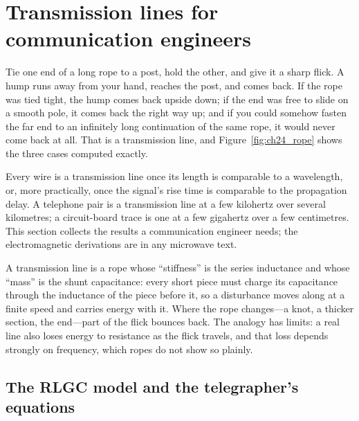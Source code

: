 \section{Transmission lines for communication engineers}
\label{sec:ch24:tline}

Tie one end of a long rope to a post, hold the other, and give it a sharp flick. A hump runs away
from your hand, reaches the post, and comes back. If the rope was tied tight, the hump comes back
upside down; if the end was free to slide on a smooth pole, it comes back the right way up; and if
you could somehow fasten the far end to an infinitely long continuation of the same rope, it would
never come back at all. That is a transmission line, and Figure~\ref{fig:ch24_rope} shows the
three cases computed exactly.

Every wire is a transmission line once its length is comparable to a wavelength, or, more
practically, once the signal's rise time is comparable to the propagation delay. A telephone pair
is a transmission line at a few kilohertz over several kilometres; a circuit-board trace is one at
a few gigahertz over a few centimetres. This section collects the results a communication
engineer needs; the electromagnetic derivations are in any microwave text.



\begin{analogy}
A transmission line is a rope whose ``stiffness'' is the series inductance and whose ``mass'' is
the shunt capacitance: every short piece must charge its capacitance through the inductance of the
piece before it, so a disturbance moves along at a finite speed and carries energy with it. Where
the rope changes---a knot, a thicker section, the end---part of the flick bounces back. The
analogy has limits: a real line also loses energy to resistance as the flick travels, and that
loss depends strongly on frequency, which ropes do not show so plainly.
\end{analogy}

\subsection{The RLGC model and the telegrapher's equations}

